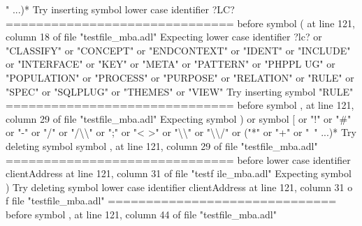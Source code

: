 {  " ...)*\newline
  Try inserting symbol lower case identifier ?LC?\newline
  \newline
  ==============================\newline
  \newline
  before symbol ( at line 121, column 18 of file "testfile\_mba.adl"\newline
  Expecting lower case identifier ?lc? or "CLASSIFY" or "CONCEPT" or "ENDCONTEXT"\newline
  or "IDENT" or "INCLUDE" or "INTERFACE" or "KEY" or "META" or "PATTERN" or "PHPPL\newline
  UG" or "POPULATION" or "PROCESS" or "PURPOSE" or "RELATION" or "RULE" or "SPEC"\newline
  or "SQLPLUG" or "THEMES" or "VIEW"\newline
  Try inserting symbol "RULE"\newline
  \newline
  ==============================\newline
  \newline
  before symbol , at line 121, column 29 of file "testfile\_mba.adl"\newline
  Expecting symbol ) or symbol [ or "!" or "\#" or "-" or "/" or "/\textbackslash{}\textbackslash{}" or ";" or "<\newline
  >" or "\textbackslash{}\textbackslash{}" or "\textbackslash{}\textbackslash{}/" or ("*" or "+" or "~" ...)*\newline
  Try deleting symbol symbol , at line 121, column 29 of file "testfile\_mba.adl"\newline
  \newline
  ==============================\newline
  \newline
  before lower case identifier clientAddress at line 121, column 31 of file "testf\newline
  ile\_mba.adl"\newline
  Expecting symbol )\newline
  Try deleting symbol lower case identifier clientAddress at line 121, column 31 o\newline
  f file "testfile\_mba.adl"\newline
  \newline
  ==============================\newline
  \newline
  before symbol , at line 121, column 44 of file "testfile\_mba.adl"\newline
}

